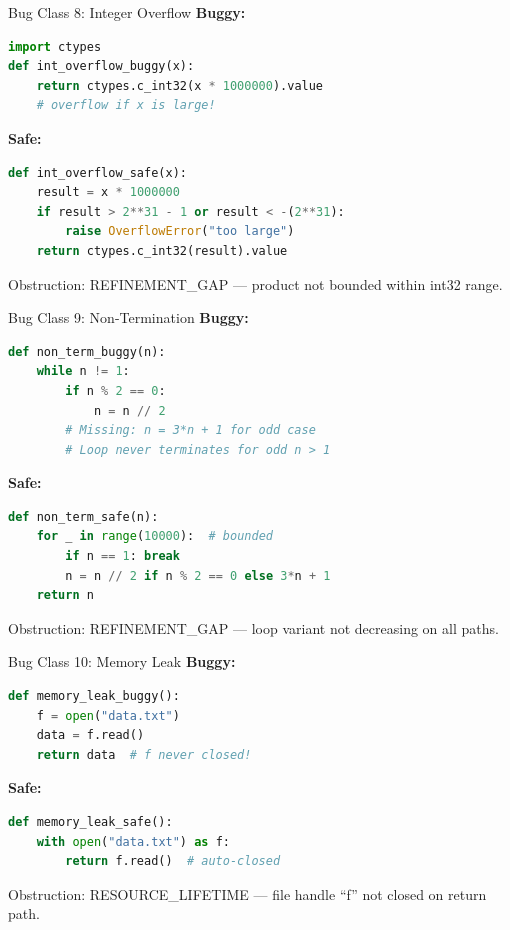 \documentclass[aspectratio=169,10pt]{beamer}
\newcommand{\warn}[1]{\begin{center}
  \colorbox{warnbg}{\parbox{0.88\textwidth}{\centering\small #1}}\end{center}}
\begin{document}
\begin{frame}[fragile]{Bug Class 8: Integer Overflow}
\textbf{Buggy:}
\begin{lstlisting}[language=Python, basicstyle=\ttfamily\scriptsize]
import ctypes
def int_overflow_buggy(x):
    return ctypes.c_int32(x * 1000000).value
    # overflow if x is large!
\end{lstlisting}
\textbf{Safe:}
\begin{lstlisting}[language=Python, basicstyle=\ttfamily\scriptsize]
def int_overflow_safe(x):
    result = x * 1000000
    if result > 2**31 - 1 or result < -(2**31):
        raise OverflowError("too large")
    return ctypes.c_int32(result).value
\end{lstlisting}
\warn{Obstruction: REFINEMENT\_GAP --- product not bounded within int32 range.}
\end{frame}

\begin{frame}[fragile]{Bug Class 9: Non-Termination}
\textbf{Buggy:}
\begin{lstlisting}[language=Python, basicstyle=\ttfamily\scriptsize]
def non_term_buggy(n):
    while n != 1:
        if n % 2 == 0:
            n = n // 2
        # Missing: n = 3*n + 1 for odd case
        # Loop never terminates for odd n > 1
\end{lstlisting}
\textbf{Safe:}
\begin{lstlisting}[language=Python, basicstyle=\ttfamily\scriptsize]
def non_term_safe(n):
    for _ in range(10000):  # bounded
        if n == 1: break
        n = n // 2 if n % 2 == 0 else 3*n + 1
    return n
\end{lstlisting}
\warn{Obstruction: REFINEMENT\_GAP --- loop variant not decreasing on all paths.}
\end{frame}

\begin{frame}[fragile]{Bug Class 10: Memory Leak}
\textbf{Buggy:}
\begin{lstlisting}[language=Python, basicstyle=\ttfamily\scriptsize]
def memory_leak_buggy():
    f = open("data.txt")
    data = f.read()
    return data  # f never closed!
\end{lstlisting}
\textbf{Safe:}
\begin{lstlisting}[language=Python, basicstyle=\ttfamily\scriptsize]
def memory_leak_safe():
    with open("data.txt") as f:
        return f.read()  # auto-closed
\end{lstlisting}
\warn{Obstruction: RESOURCE\_LIFETIME --- file handle ``f'' not closed on return path.}
\end{frame}
\end{document}
